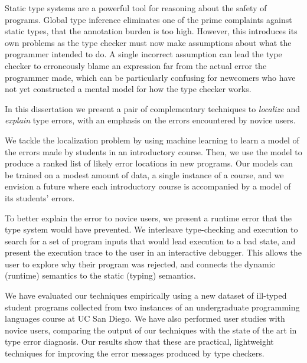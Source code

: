 \documentclass[11pt]{ucsddissertation}
\theoremstyle{plain}%
\theoremstyle{definition}
\begin{document}
\begin{dissertationabstract}
Static type systems are a powerful tool for reasoning about the safety
of programs.
%
Global type inference eliminates one of the prime complaints against
static types, that the annotation burden is too high.
%
However, this introduces its own problems as the type checker must now
make assumptions about what the programmer intended to do.
%
A single incorrect assumption can lead the type checker to erroneously
blame an expression far from the actual error the programmer made, which
can be particularly confusing for newcomers who have not yet constructed
a mental model for how the type checker works.

In this dissertation we present a pair of complementary techniques to
\emph{localize} and \emph{explain} type errors, with an emphasis on the
errors encountered by novice users.

We tackle the localization problem by using machine learning to learn a
model of the errors made by students in an introductory course. Then, we
use the model to produce a ranked list of likely error locations in new
programs. Our models can be trained on a modest amount of data, \eg a
single instance of a course, and we envision a future where each
introductory course is accompanied by a model of its students' errors.

To better explain the error to novice users, we present a runtime error
that the type system would have prevented. We interleave type-checking
and execution to search for a set of program inputs that would lead
execution to a bad state, and present the execution trace to the user in
an interactive debugger. This allows the user to explore why their
program was rejected, and connects the dynamic (runtime) semantics to
the static (typing) semantics.

We have evaluated our techniques empirically using a new dataset of
ill-typed student programs collected from two instances of an
undergraduate programming languages course at UC San Diego.
%
We have also performed user studies with novice users, comparing the
output of our techniques with the state of the art in type error
diagnosis.
%
Our results show that these are practical, lightweight techniques for
improving the error messages produced by type checkers.
\end{dissertationabstract}

\mainmatter
\end{document}
